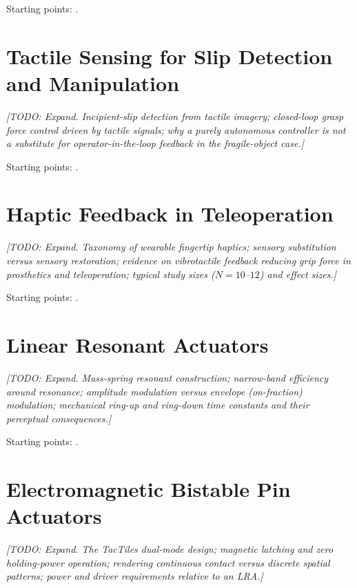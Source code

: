 \documentclass[12pt, a4paper, twoside, openright]{report}
\newcommand{\todo}[1]{\textit{[TODO: #1]}}
\begin{document}
Starting points: \cite{donggelsight2021,lin2023,dahiya2010}.

\section{Tactile Sensing for Slip Detection and Manipulation}
\label{sec:lit-slip}

\todo{Expand. Incipient-slip detection from tactile imagery; closed-loop grasp
    force control driven by tactile signals; why a purely autonomous controller is
    not a substitute for operator-in-the-loop feedback in the fragile-object case.}

Starting points: \cite{taylor2021,garciarobledo2011,vipins2025}.

\section{Haptic Feedback in Teleoperation}
\label{sec:lit-haptics}

\todo{Expand. Taxonomy of wearable fingertip haptics; sensory substitution
    versus sensory restoration; evidence on vibrotactile feedback reducing grip
    force in prosthetics and teleoperation; typical study sizes ($N=10$--$12$) and
    effect sizes.}

Starting points: \cite{pacchierotti2017,pacchierotti2015,pacchierotti2015b,tsetserukou2010,luo2024,abdi2020}.

\section{Linear Resonant Actuators}
\label{sec:lit-lra}

\todo{Expand. Mass-spring resonant construction; narrow-band efficiency around
    resonance; amplitude modulation versus envelope (on-fraction) modulation;
    mechanical ring-up and ring-down time constants and their perceptual
    consequences.}

Starting points: \cite{verrillo1985,choi2013,pacchierotti2015}.

\section{Electromagnetic Bistable Pin Actuators}
\label{sec:lit-em}

\todo{Expand. The TacTiles dual-mode design; magnetic latching and zero
    holding-power operation; rendering continuous contact versus discrete spatial
    patterns; power and driver requirements relative to an LRA.}
\end{document}
